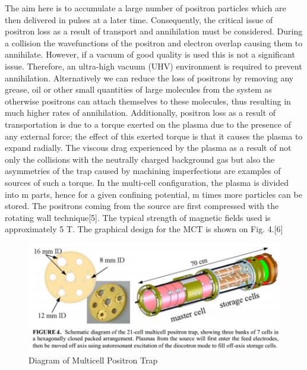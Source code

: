 The aim here is to accumulate a large number of positron particles which are then delivered in pulses at a later time. Consequently, the critical issue of positron loss as a result of transport and annihilation must be considered. During a collision the wavefunctions of the positron and electron overlap causing them to annihilate. However, if a vacuum of good quality is used this is not a significant issue. Therefore, an ultra-high vacuum (UHV) environment is required to prevent annihilation. Alternatively we can reduce the loss of positrons by removing any grease, oil or other small quantities of large molecules from the system as otherwise positrons can attach themselves to these molecules, thus resulting in much higher rates of annihilation. Additionally, positron loss as a result of transportation is due to a torque exerted on the plasma due to the presence of any external force; the effect of this exerted torque is that it causes the plasma to expand radially. The viscous drag experienced by the plasma as a result of not only the collisions with the neutrally charged background gas but also the asymmetries of the trap caused by machining imperfections are examples of sources of such a torque.
In the multi-cell configuration, the plasma is divided into m parts, hence for a given confining potential, m times more particles can be stored. The positrons coming from the source are first compressed with the rotating wall technique[5]. The typical strength of magnetic fields used is approximately 5 T. The graphical design for the MCT is shown on Fig. 4.[6]

\begin{figure}[h]
\centering
\includegraphics{Figures/C2F4}
\decoRule
\caption[C2F4]{Diagram of Multicell Positron Trap}
\label{fig:C2F4}
\end{figure}

